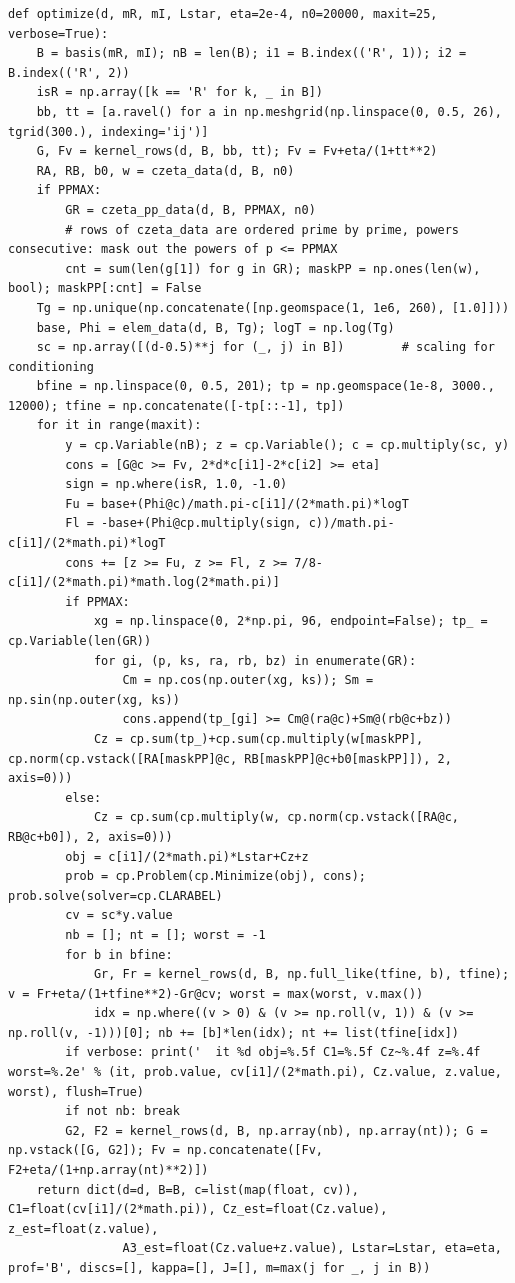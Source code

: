 \documentclass[11pt,reqno]{amsart}
\numberwithin{equation}{section}
\theoremstyle{definition}
\theoremstyle{remark}
\begin{document}
\begin{lstlisting}
def optimize(d, mR, mI, Lstar, eta=2e-4, n0=20000, maxit=25, verbose=True):
    B = basis(mR, mI); nB = len(B); i1 = B.index(('R', 1)); i2 = B.index(('R', 2))
    isR = np.array([k == 'R' for k, _ in B])
    bb, tt = [a.ravel() for a in np.meshgrid(np.linspace(0, 0.5, 26), tgrid(300.), indexing='ij')]
    G, Fv = kernel_rows(d, B, bb, tt); Fv = Fv+eta/(1+tt**2)
    RA, RB, b0, w = czeta_data(d, B, n0)
    if PPMAX:
        GR = czeta_pp_data(d, B, PPMAX, n0)
        # rows of czeta_data are ordered prime by prime, powers consecutive: mask out the powers of p <= PPMAX
        cnt = sum(len(g[1]) for g in GR); maskPP = np.ones(len(w), bool); maskPP[:cnt] = False
    Tg = np.unique(np.concatenate([np.geomspace(1, 1e6, 260), [1.0]]))
    base, Phi = elem_data(d, B, Tg); logT = np.log(Tg)
    sc = np.array([(d-0.5)**j for (_, j) in B])        # scaling for conditioning
    bfine = np.linspace(0, 0.5, 201); tp = np.geomspace(1e-8, 3000., 12000); tfine = np.concatenate([-tp[::-1], tp])
    for it in range(maxit):
        y = cp.Variable(nB); z = cp.Variable(); c = cp.multiply(sc, y)
        cons = [G@c >= Fv, 2*d*c[i1]-2*c[i2] >= eta]
        sign = np.where(isR, 1.0, -1.0)
        Fu = base+(Phi@c)/math.pi-c[i1]/(2*math.pi)*logT
        Fl = -base+(Phi@cp.multiply(sign, c))/math.pi-c[i1]/(2*math.pi)*logT
        cons += [z >= Fu, z >= Fl, z >= 7/8-c[i1]/(2*math.pi)*math.log(2*math.pi)]
        if PPMAX:
            xg = np.linspace(0, 2*np.pi, 96, endpoint=False); tp_ = cp.Variable(len(GR))
            for gi, (p, ks, ra, rb, bz) in enumerate(GR):
                Cm = np.cos(np.outer(xg, ks)); Sm = np.sin(np.outer(xg, ks))
                cons.append(tp_[gi] >= Cm@(ra@c)+Sm@(rb@c+bz))
            Cz = cp.sum(tp_)+cp.sum(cp.multiply(w[maskPP], cp.norm(cp.vstack([RA[maskPP]@c, RB[maskPP]@c+b0[maskPP]]), 2, axis=0)))
        else:
            Cz = cp.sum(cp.multiply(w, cp.norm(cp.vstack([RA@c, RB@c+b0]), 2, axis=0)))
        obj = c[i1]/(2*math.pi)*Lstar+Cz+z
        prob = cp.Problem(cp.Minimize(obj), cons); prob.solve(solver=cp.CLARABEL)
        cv = sc*y.value
        nb = []; nt = []; worst = -1
        for b in bfine:
            Gr, Fr = kernel_rows(d, B, np.full_like(tfine, b), tfine); v = Fr+eta/(1+tfine**2)-Gr@cv; worst = max(worst, v.max())
            idx = np.where((v > 0) & (v >= np.roll(v, 1)) & (v >= np.roll(v, -1)))[0]; nb += [b]*len(idx); nt += list(tfine[idx])
        if verbose: print('  it %d obj=%.5f C1=%.5f Cz~%.4f z=%.4f worst=%.2e' % (it, prob.value, cv[i1]/(2*math.pi), Cz.value, z.value, worst), flush=True)
        if not nb: break
        G2, F2 = kernel_rows(d, B, np.array(nb), np.array(nt)); G = np.vstack([G, G2]); Fv = np.concatenate([Fv, F2+eta/(1+np.array(nt)**2)])
    return dict(d=d, B=B, c=list(map(float, cv)), C1=float(cv[i1]/(2*math.pi)), Cz_est=float(Cz.value), z_est=float(z.value),
                A3_est=float(Cz.value+z.value), Lstar=Lstar, eta=eta, prof='B', discs=[], kappa=[], J=[], m=max(j for _, j in B))


\end{lstlisting}
\end{document}
